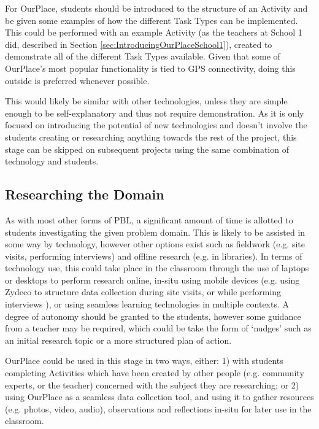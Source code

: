 For OurPlace, students should be introduced to the structure of an Activity and be given some examples of how the different Task Types can be implemented. This could be performed with an example Activity (as the teachers at School 1 did, described in Section \ref{sec:IntroducingOurPlaceSchool1}), created to demonstrate all of the different Task Types available. Given that some of OurPlace's most popular functionality is tied to GPS connectivity, doing this outside is preferred whenever possible. 

This would likely be similar with other technologies, unless they are simple enough to be self-explanatory and thus not require demonstration. As it is only focused on introducing the potential of new technologies and doesn't involve the students creating or researching anything towards the rest of the project, this stage can be skipped on subsequent projects using the same combination of technology and students.

\subsection{Researching the Domain}
As with most other forms of PBL, a significant amount of time is allotted to students investigating the given problem domain. This is likely to be assisted in some way by technology, however other options exist such as fieldwork (e.g. site visits, performing interviews) and offline research (e.g. in libraries). In terms of technology use, this could take place in the classroom through the use of laptops or desktops to perform research online, in-situ using mobile devices (e.g. using Zydeco to structure data collection during site visits, or while performing interviews \citep{kuhn2011}), or using seamless learning technologies in multiple contexts. A degree of autonomy should be granted to the students, however some guidance from a teacher may be required, which could be take the form of `nudges' such as an initial research topic or a more structured plan of action.

OurPlace could be used in this stage in two ways, either: 1) with students completing Activities which have been created by other people (e.g. community experts, or the teacher) concerned with the subject they are researching; or 2) using OurPlace as a seamless data collection tool, and using it to gather resources (e.g. photos, video, audio), observations and reflections in-situ for later use in the classroom. 

